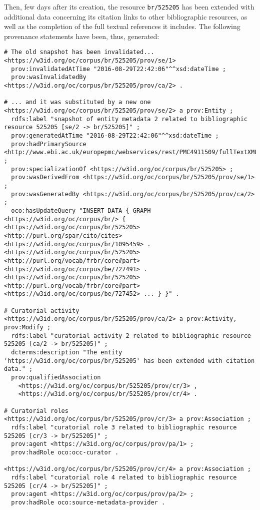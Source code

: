 \documentclass[runningheads,a4paper]{llncs}
\begin{document}
Then, few days after its creation, the resource \Verb+br/525205+ has been extended with additional data concerning its citation links to other bibliographic resources, as well as the completion of the full textual references it includes. The following provenance statements have been, thus, generated:

\begin{lstlisting}[mathescape]
# The old snapshot has been invalidated...
<https://w3id.org/oc/corpus/br/525205/prov/se/1> 
  prov:invalidatedAtTime "2016-08-29T22:42:06"^^xsd:dateTime ;
  prov:wasInvalidatedBy <https://w3id.org/oc/corpus/br/525205/prov/ca/2> .

# ... and it was substituted by a new one
<https://w3id.org/oc/corpus/br/525205/prov/se/2> a prov:Entity ;
  rdfs:label "snapshot of entity metadata 2 related to bibliographic resource 525205 [se/2 -> br/525205]" ;
  prov:generatedAtTime "2016-08-29T22:42:06"^^xsd:dateTime ;
  prov:hadPrimarySource <http://www.ebi.ac.uk/europepmc/webservices/rest/PMC4911509/fullTextXML> ;
  prov:specializationOf <https://w3id.org/oc/corpus/br/525205> ;
  prov:wasDerivedFrom <https://w3id.org/oc/corpus/br/525205/prov/se/1> ;
  prov:wasGeneratedBy <https://w3id.org/oc/corpus/br/525205/prov/ca/2> ;
  oco:hasUpdateQuery "INSERT DATA { GRAPH <https://w3id.org/oc/corpus/br/> { <https://w3id.org/oc/corpus/br/525205> <http://purl.org/spar/cito/cites> <https://w3id.org/oc/corpus/br/1095459> . <https://w3id.org/oc/corpus/br/525205> <http://purl.org/vocab/frbr/core#part> <https://w3id.org/oc/corpus/be/727491> . <https://w3id.org/oc/corpus/br/525205> <http://purl.org/vocab/frbr/core#part> <https://w3id.org/oc/corpus/be/727452> ... } }" .

# Curatorial activity
<https://w3id.org/oc/corpus/br/525205/prov/ca/2> a prov:Activity, prov:Modify ;
  rdfs:label "curatorial activity 2 related to bibliographic resource 525205 [ca/2 -> br/525205]" ;
  dcterms:description "The entity 'https://w3id.org/oc/corpus/br/525205' has been extended with citation data." ;
  prov:qualifiedAssociation 
    <https://w3id.org/oc/corpus/br/525205/prov/cr/3> ,
    <https://w3id.org/oc/corpus/br/525205/prov/cr/4> .

# Curatorial roles
<https://w3id.org/oc/corpus/br/525205/prov/cr/3> a prov:Association ;
  rdfs:label "curatorial role 3 related to bibliographic resource 525205 [cr/3 -> br/525205]" ;
  prov:agent <https://w3id.org/oc/corpus/prov/pa/1> ;
  prov:hadRole oco:occ-curator .
  
<https://w3id.org/oc/corpus/br/525205/prov/cr/4> a prov:Association ;
  rdfs:label "curatorial role 4 related to bibliographic resource 525205 [cr/4 -> br/525205]" ;
  prov:agent <https://w3id.org/oc/corpus/prov/pa/2> ;
  prov:hadRole oco:source-metadata-provider .
\end{lstlisting}
\end{document}
